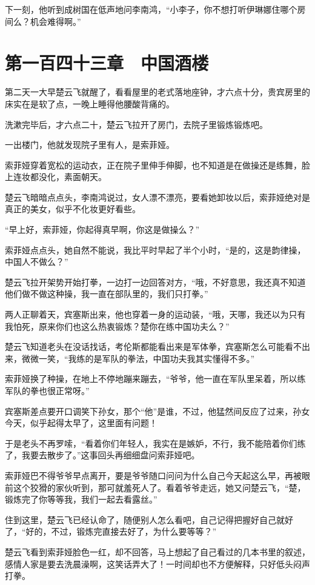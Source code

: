 下一刻，他听到成树国在低声地问李南鸿，“小李子，你不想打听伊琳娜住哪个房间么？机会难得啊。”

\section{第一百四十三章　中国酒楼}

第二天一大早楚云飞就醒了，看看屋里的老式落地座钟，才六点十分，贵宾房里的床实在是软了点，一晚上睡得他腰酸背痛的。

洗漱完毕后，才六点二十，楚云飞拉开了房门，去院子里锻炼锻炼吧。

一出楼门，他就发现院子里有人，是索菲娅。

索菲娅穿着宽松的运动衣，正在院子里伸手伸脚，也不知道是在做操还是练舞，脸上连妆都没化，素面朝天。

楚云飞暗暗点点头，李南鸿说过，女人漂不漂亮，要看她卸妆以后，索菲娅绝对是真正的美女，似乎不化妆更好看些。

“早上好，索菲娅，你起得真早啊，你这是做操么？”

索菲娅点点头，她自然不能说，我比平时早起了半个小时，“是的，这是韵律操，中国人不做么？”

楚云飞拉开架势开始打拳，一边打一边回答对方，“哦，不好意思，我还真不知道他们做不做这种操，我一直在部队里的，我们只打拳。”

两人正聊着天，宾塞斯出来，他也穿着一身的运动装，“哦，天哪，我还以为只有我怕死，原来你们也这么热衷锻炼？楚你在练中国功夫么？”

楚云飞知道老头在没话找话，考伦斯都能看出来是军体拳，宾塞斯怎么可能看不出来，微微一笑，“我练的是军队的拳法，中国功夫我其实懂得不多。”

索菲娅换了种操，在地上不停地蹦来蹦去，“爷爷，他一直在军队里呆着，所以练军队的拳也很正常呀。”

宾塞斯差点要开口调笑下孙女，那个“他”是谁，不过，他猛然间反应了过来，孙女今天，似乎起得太早了，这里面有问题！

于是老头不再罗嗦，“看着你们年轻人，我实在是嫉妒，不行，我不能陪着你们练了，我要去散步了。”这事回头再细细盘问索菲娅吧。

索菲娅巴不得爷爷早点离开，要是爷爷随口问问为什么自己今天起这么早，再被眼前这个狡猾的家伙听到，那可就羞死人了。看着爷爷走远，她又问楚云飞，“楚，锻炼完了你等等我，我们一起去看露丝。”

住到这里，楚云飞已经认命了，随便别人怎么看吧，自己记得把握好自己就好了，“好的，不过，锻炼完直接去好了，为什么要等等？”

楚云飞看到索菲娅脸色一红，却不回答，马上想起了自己看过的几本书里的叙述，感情人家是要去洗晨澡啊，这笑话弄大了！一时间却也不方便解释，只好低头闷声打拳。

